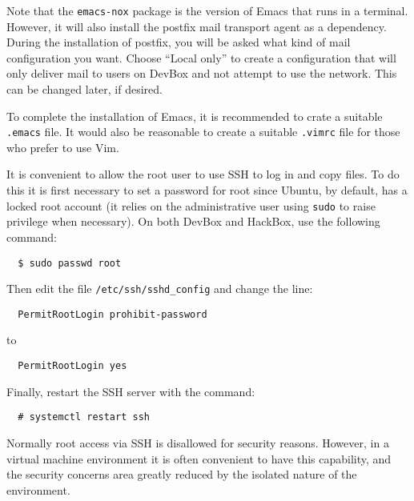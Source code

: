 \documentclass{article}
\newcommand{\command}[1]{\texttt{#1}}
\newcommand{\filename}[1]{\texttt{#1}}
\begin{document}
Note that the \texttt{emacs-nox} package is the version of Emacs that runs in a terminal.
However, it will also install the postfix mail transport agent as a dependency. During the
installation of postfix, you will be asked what kind of mail configuration you want. Choose
``Local only'' to create a configuration that will only deliver mail to users on DevBox and not
attempt to use the network. This can be changed later, if desired.

To complete the installation of Emacs, it is recommended to crate a suitable \filename{.emacs}
file. It would also be reasonable to create a suitable \filename{.vimrc} file for those who
prefer to use Vim.

It is convenient to allow the root user to use SSH to log in and copy files. To do this it is
first necessary to set a password for root since Ubuntu, by default, has a locked root account
(it relies on the administrative user using \command{sudo} to raise privilege when necessary).
On both DevBox and HackBox, use the following command:
\begin{Verbatim}
  $ sudo passwd root
\end{Verbatim}

Then edit the file \filename{/etc/ssh/sshd\_config} and change the line:
\begin{Verbatim}
  PermitRootLogin prohibit-password
\end{Verbatim}
to
\begin{Verbatim}
  PermitRootLogin yes
\end{Verbatim}

Finally, restart the SSH server with the command:
\begin{Verbatim}
  # systemctl restart ssh
\end{Verbatim}

Normally root access via SSH is disallowed for security reasons. However, in a virtual machine
environment it is often convenient to have this capability, and the security concerns area
greatly reduced by the isolated nature of the environment.
\end{document}
